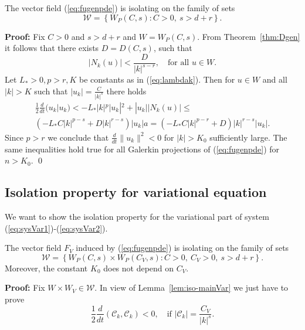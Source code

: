 \begin{lemma}
	\label{lem:iso-mainVar}
	The vector field (\ref{eq:fugenpde}) is isolating on the family of sets
	$$\mathcal W = \left\{W_P(C,s) : C>0,\ s>d+r\right\}.$$
\end{lemma}
\textbf{Proof:}
Fix $C>0$ and $s>d+r$ and $W=W_P(C,s)$. From Theorem~\ref{thm:Dgen} it follows that there exists
$D=D(C,s)$, such that
\begin{equation*}
	|N_k(u)| < \frac{D}{|k|^{s - r}}, \quad \mbox{for all $u \in W$.}
\end{equation*}
Let $L_*>0, p>r, K$ be constants as in (\ref{eq:lambdak}).
Then for $u \in W $ and all $|k|>K$ such that $|u_{k}|=\frac{C}{|k|^{s}}$ there holds
\begin{multline*}
	\frac{1}{2}\frac{d}{dt}(u_{k}|u_{k}) < -L_* |k|^p |u_{k}|^2 + |u_{k}| |N_{k}(u)| \leq  \\
	\left(- L_* C |k|^{p-s} + D |k|^{r -s}\right) |u_{k}| a
	= \left(- L_* C |k|^{p-r} + D \right) |k|^{r-s}|u_{k}|.
\end{multline*}
Since $p>r$ we conclude that $\frac{d}{dt}\|u_k\|^2<0$ for $|k|>K_0$ sufficiently large. The same inequalities hold true for all Galerkin projections of (\ref{eq:fugenpde}) for $n>K_0$.
\qed

\subsection{Isolation property for variational equation}


We want to show the isolation property for the variational part of system (\ref{eq:sysVar1})-(\ref{eq:sysVar2}).

\begin{lemma}
\label{lem:iso-VarVar}
The vector field $F_V$ induced by (\ref{eq:fugenpde}) is isolating on the family of sets
$$
\mathcal W =\left\{W_P(C,s)\times W_P(C_V,s) : C>0,\ C_V>0,\ s>d+r\right\}.
$$
Moreover, the constant $K_0$ does not depend on $C_V$.
\end{lemma}
\textbf{Proof:} Fix $W\times W_V\in\mathcal W$. In view of Lemma~\ref{lem:iso-mainVar} we just have to prove
\begin{equation}
	\frac{1}{2}\frac{d}{dt}(\mathcal{C}_k,\mathcal{C}_k) < 0, \quad \mbox{if $|\mathcal{C}_k| = \frac{C_V}{|k|^s}$}. \label{eq:iso-VarVar}
\end{equation}

